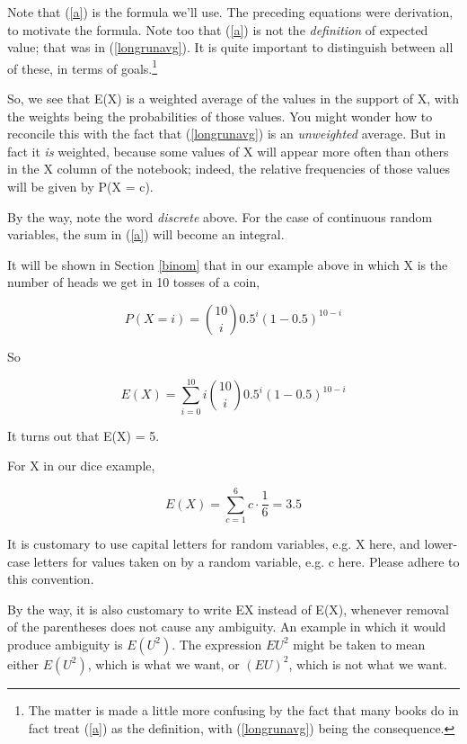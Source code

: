 Note that (\ref{a}) is the formula we'll use.  The preceding equations
were derivation, to motivate the formula.  Note too that (\ref{a}) is
not the {\it definition} of expected value; that was in
(\ref{longrunavg}).  It is quite important to distinguish between all of
these, in terms of goals.\footnote{The matter is made a little more
confusing by the fact that many books do in fact treat (\ref{a}) as the
definition, with (\ref{longrunavg}) being the consequence.}

So, we see that E(X) is a weighted average of the values in the support
of X, with the weights being the probabilities of those values.  You
might wonder how to reconcile this with the fact that (\ref{longrunavg})
is an {\it unweighted} average.  But in fact it {\it is} weighted,
because some values of X will appear more often than others in the X
column of the notebook; indeed, the relative frequencies of those values
will be given by P(X = c).

By the way, note the word {\it discrete} above.  For the case of
continuous random variables, the sum in (\ref{a}) will become an
integral.

It will be shown in Section \ref{binom} that in our example above in
which X is the number of heads we get in 10 tosses of a coin,

\begin{equation}
P(X = i) =  \binom{10}{i} 0.5^i (1-0.5)^{10-i}  
\end{equation}

So

\begin{equation}
E(X) =  \sum_{i=0}^{10} i \binom{10}{i} 0.5^i (1-0.5)^{10-i}  
\end{equation}

It turns out that E(X) = 5.

For X in our dice example, 

\begin{equation}
E(X) = \sum_{c=1}^6 c \cdot \frac{1}{6} = 3.5
\end{equation}

It is customary to use capital letters for random variables, e.g. X
here, and lower-case letters for values taken on by a random variable,
e.g. c here.  Please adhere to this convention.  

By the way, it is also customary to write EX instead of E(X), whenever
removal of the parentheses does not cause any ambiguity.  An example in
which it would produce ambiguity is $E(U^2)$.  The expression $EU^2$
might be taken to mean either $E(U^2)$, which is what we want, or
$(EU)^2$, which is not what we want.

